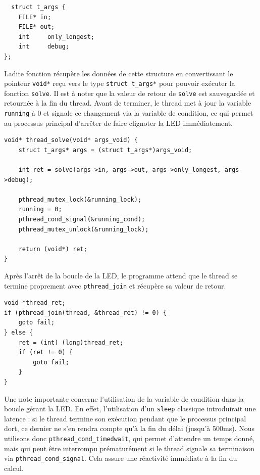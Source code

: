 \documentclass[a4paper,11pt]{article}
\begin{document}
\begin{verbatim}
  struct t_args {
    FILE* in;
    FILE* out;
    int     only_longest;
    int     debug;
};  
\end{verbatim}

Ladite fonction récupère les données de cette structure en convertissant le pointeur \texttt{void*} reçu vers le type \texttt{struct t\_args*} pour pouvoir exécuter la fonction \texttt{solve}. Il est à noter que la valeur de retour de \texttt{solve} est sauvegardée et retournée à la fin du thread. Avant de terminer, le thread met à jour la variable \texttt{running} à 0 et signale ce changement via la variable de condition, ce qui permet au processus principal d'arrêter de faire clignoter la LED immédiatement.

\begin{verbatim}
void* thread_solve(void* args_void) {
    struct t_args* args = (struct t_args*)args_void;

    int ret = solve(args->in, args->out, args->only_longest, args->debug);

    pthread_mutex_lock(&running_lock);
    running = 0;
    pthread_cond_signal(&running_cond);
    pthread_mutex_unlock(&running_lock);

    return (void*) ret; 
}
\end{verbatim}

Après l'arrêt de la boucle de la LED, le programme attend que le thread se termine proprement avec \texttt{pthread\_join} et récupère sa valeur de retour.

\begin{verbatim}
void *thread_ret;
if (pthread_join(thread, &thread_ret) != 0) {
    goto fail;
} else {
    ret = (int) (long)thread_ret; 
    if (ret != 0) {
        goto fail;
    }
}
\end{verbatim}

Une note importante concerne l'utilisation de la variable de condition dans la boucle gérant la LED. En effet, l'utilisation d'un \texttt{sleep} classique introduirait une latence : si le thread termine son exécution pendant que le processus principal dort, ce dernier ne s'en rendra compte qu'à la fin du délai (jusqu'à 500ms). Nous utilisons donc \texttt{pthread\_cond\_timedwait}, qui permet d'attendre un temps donné, mais qui peut être interrompu prématurément si le thread signale sa terminaison via \texttt{pthread\_cond\_signal}. Cela assure une réactivité immédiate à la fin du calcul.
\end{document}
